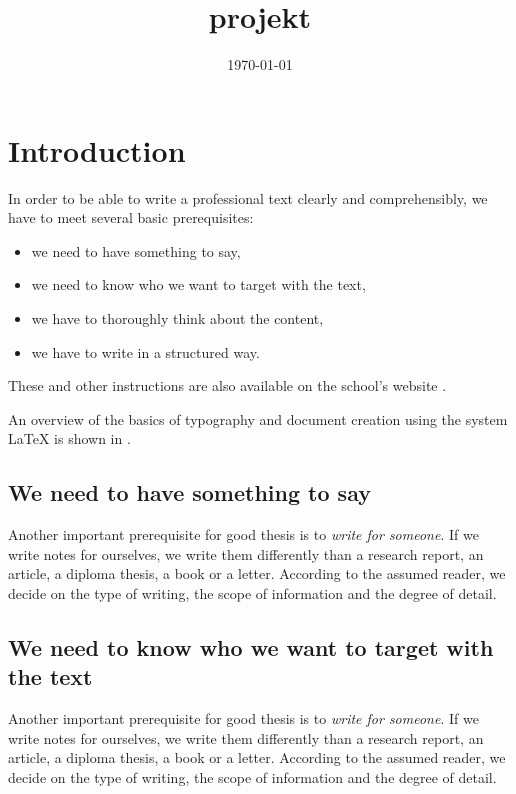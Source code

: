 \documentclass[english,odsaz]{fitthesis}
\date{\today}
\title{projekt}
\begin{document}
\maketitle
\setlength{\parskip}{0pt}
{\hypersetup{hidelinks}\tableofcontents}
\iftwoside\cleardoublepage\fi
\setlength{\parskip}{0.5\bigskipamount}

\chapter{Introduction}
\label{sec-1}
In order to be able to write a professional text clearly and comprehensibly, we
have to meet several basic prerequisites:
\begin{itemize}
\item we need to have something to say,
\item we need to know who we want to target with the text,
\item we have to thoroughly think about the content,
\item we have to write in a structured way.
\end{itemize}

These and other instructions are also available on the school's website
\cite{fitWeb}.

An overview of the basics of typography and document creation using the system
\LaTeX{} is shown in \cite{Rybicka}.

\section{We need to have something to say}
\label{sec-1-1}
Another important prerequisite for good thesis is to \emph{write for someone}. If
we write notes for ourselves, we write them differently than a research report,
an article, a diploma thesis, a book or a letter. According to the assumed
reader, we decide on the type of writing, the scope of information and the
degree of detail.

\section{We need to know who we want to target with the text}
\label{sec-1-2}
Another important prerequisite for good thesis is to \emph{write for someone}. If
we write notes for ourselves, we write them differently than a research report,
an article, a diploma thesis, a book or a letter. According to the assumed
reader, we decide on the type of writing, the scope of information and the
degree of detail.
\end{document}

